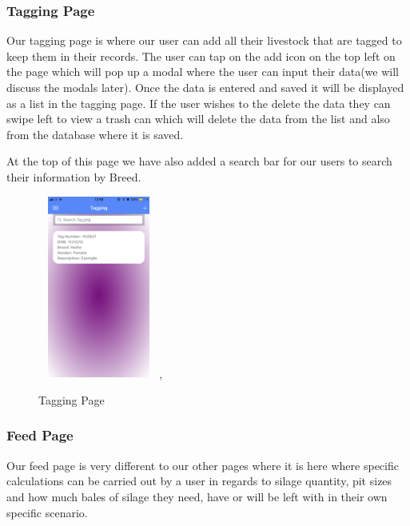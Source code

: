 \documentclass[12pt,a4paper,oneside,openany]{book}
\begin{document}

\newpage
\subsubsection{Tagging Page}
Our tagging page is where our user can add all their livestock that are tagged to keep them in their records. The user can tap on the add icon on the top left on the page which will pop up a modal where the user can input their data(we will discuss the modals later). Once the data is entered and saved it will be displayed as a list in the tagging page. If the user wishes to the delete the data they can swipe left to view a trash can which will delete the data from the list and also from the database where it is saved.

At the top of this page we have also added a search bar for our users to search their information by Breed.

\begin{figure}[ht]
\renewcommand\thefigure{5.13}
\centering
\includegraphics[width=4cm,height=6cm]{Images/tagging.png},
\caption{Tagging Page}
\label{tagging}
\end{figure}

\subsubsection{Feed Page}
Our feed page is very different to our other pages where it is here where specific calculations can be carried out by a user in regards to silage quantity, pit sizes and how much bales of silage they need, have or will be left with in their own specific scenario. 
\end{document}
